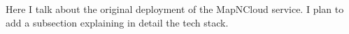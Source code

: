 Here I talk about the original deployment of the MapNCloud service. I plan to add a subsection explaining in detail the tech stack.
